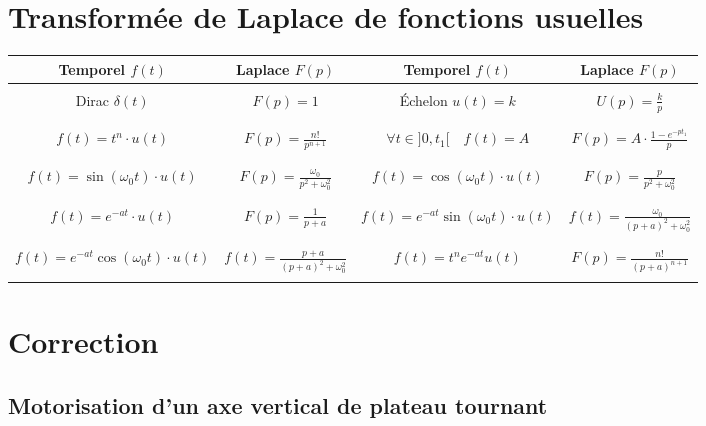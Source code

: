 \section{Transformée de Laplace de fonctions usuelles}

\begin{center}
\begin{tabular}{|c|c||c|c|}
\hline
Temporel $f(t)$ & Laplace $F(p)$ & 
Temporel $f(t)$ & Laplace $F(p)$ \\
\hline
\hline
 &&& \\
Dirac $\delta(t)$ &
$F(p)=1$ &
Échelon $ u(t)=k $&
$ U(p) = \frac{k}{p}$
\\
&&& \\
\hline
&&& \\
$f(t) = t^n\cdot u(t)$ &
$F(p)=\frac{n!}{p^{n+1}} $ &
$\forall t\in ]0,t_1 [ \quad f(t)= A$ & 
$F(p) =A \cdot \frac{1-e^{-pt_1}}{p} $\\
&&& \\
\hline
&&& \\
$f(t) = \sin \left( \omega_0 t\right) \cdot u(t)$ &
$F(p) = \frac{\omega_0}{p^2+\omega_0^2} $ &
$f(t) = \cos \left( \omega_0 t\right) \cdot u(t)$ & 
$F(p) = \frac{p}{p^2+\omega_0^2} $ \\
&&& \\
\hline
&&& \\
$f(t)= e^{-at}\cdot u(t)$ & 
$F(p)= \frac{1}{p+a}$ &
$f(t) = e^{-at}\sin\left( \omega_0 t\right) \cdot u(t)$ &
$f(t)=\frac{\omega_0}{\left( p+a\right)^2 + \omega_0^2}$  \\
&&& \\
\hline
&&& \\
$f(t) = e^{-at}\cos\left( \omega_0 t\right) \cdot u(t)$ &
$f(t)=\frac{p+a}{\left( p+a\right)^2 + \omega_0^2}$  &
$f(t)=t^ne^{-at}u(t)$ & $F(p)=\frac{n!}{\left( p+a\right)^{n+1}}$ \\
&&& \\
\hline
\end{tabular}
\end{center}


\ifdef{\public}{}{}

\newpage

\pagestyle{correction}

\section{Correction}

\subsection{Motorisation d'un axe vertical de plateau tournant}

